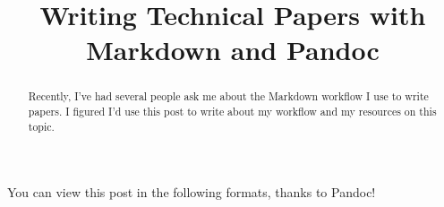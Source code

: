 \documentclass[journal,]{IEEEtran}
\begin{document}
\title{\bigskip \bigskip Writing Technical Papers with Markdown and
Pandoc}


%




%





\maketitle


\begin{abstract}

\noindent Recently, I've had several people ask me about the Markdown
workflow I use to write papers. I figured I'd use this post to write
about my workflow and my resources on this topic.

\end{abstract}



%
\IEEEpeerreviewmaketitle

You can view this post in the following formats, thanks to Pandoc!
\end{document}
